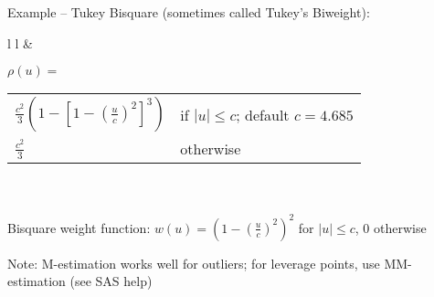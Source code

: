 \documentclass[12pt]{../notes}
\begin{document}
\vspace{1em}

Example -- Tukey Bisquare (sometimes called Tukey's Biweight):\\
\begin{tabular}{l l}
\hspace{3em}
&
\begin{minipage}[t]{6in}
 $\rho(u) = $\begin{tabular}{l l} $\frac{c^2}{3} \left( 1 - [ 1 - \left(\frac{u}{c}\right)^2 ]^3 \right)$ & if $|u| \leq c$; default $c = 4.685$ \\
                                                                $\frac{c^2}{3}$ & otherwise
                                           \end{tabular}\\
       \\
       Bisquare weight function: $w(u) = \left( 1 - \left(\frac{u}{c}\right)^2\right)^2$ for $|u| \leq c$, $0$ otherwise
\end{minipage}
\end{tabular}


\vspace{1em}

Note: M-estimation works well for outliers; for leverage points, use MM-estimation (see SAS help)
\end{document}
